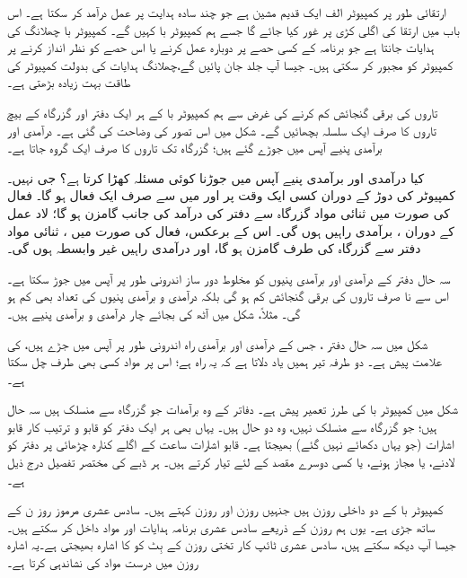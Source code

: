   ارتقائی طور پر کمپیوٹر الف  ایک قدیم  مشین ہے جو  چند سادہ ہدایت پر عمل درآمد کر سکتا ہے۔ اس باب میں  ارتقا کی اگلی کڑی  پر غور کیا جائے گا جسے ہم کمپیوٹر با کہیں گے۔ کمپیوٹر با چھلانگ  کی ہدایات  جانتا ہے جو   برنامہ  کے کسی   حصے پر دوبارہ  عمل کرنے  یا اس حصے کو نظر انداز کرنے پر کمپیوٹر کو  مجبور کر سکتی ہیں۔ جیسا آپ جلد جان پائیں گے،چھلانگ  ہدایات  کی بدولت   کمپیوٹر کی طاقت بہت زیادہ  بڑھتی ہے۔
  
  تاروں کی  برقی گنجائش کم کرنے کی غرض سے ہم کمپیوٹر با   کے ہر ایک دفتر اور  گزرگاہ کے بیچ   تاروں کا صرف ایک سلسلہ بچھائیں گے۔  شکل  میں   اس تصور کی وضاحت کی گئی ہے۔ درآمدی اور برآمدی پنیے آپس میں جوڑے گئے ہیں؛ گزرگاہ  تک  تاروں کا  صرف  ایک گروہ  جاتا ہے۔
  
کیا درآمدی اور برآمدی پنیے آپس میں جوڑنا کوئی  مسئلہ کھڑا کرتا ہے؟ جی نہیں۔ کمپیوٹر کی دوڑ کے دوران کسی ایک وقت پر   اور میں  سے  صرف ایک  فعال ہو گا۔ فعال   کی صورت میں  ثنائی مواد گزرگاہ سے دفتر  کی  درآمد    کی جانب گامزن ہو گا؛ لاد  عمل کے دوران ، برآمدی راہیں ہوں گی۔ اس کے برعکس،  فعال  کی صورت میں ،  ثنائی مواد دفتر سے  گزرگاہ کی طرف گامزن ہو گا، اور درآمدی راہیں غیر وابسطہ ہوں گی۔

سہ  حال دفتر کے درآمدی اور برآمدی پنیوں کو   مخلوط  دور ساز   اندرونی طور  پر  آپس میں جوڑ  سکتا ہے۔ اس سے نا صرف تاروں کی برقی گنجائش کم ہو گی بلکہ  درآمدی و برآمدی   پنیوں کی تعداد بھی کم ہو گی۔ مثلاً، شکل  میں آٹھ کی بجائے چار درآمدی و برآمدی پنیے ہیں۔ 

شکل  میں سہ حال دفتر ، جس کے درآمدی اور برآمدی  راہ  اندرونی طور پر   آپس میں جڑے ہیں، کی علامت  پیش ہے۔ دو طرفہ تیر ہمیں یاد دلاتا ہے کہ یہ راہ ہے؛  اس پر  مواد  کسی بھی  طرف  چل سکتا ہے۔

شکل   میں کمپیوٹر با کی طرز تعمیر پیش ہے۔   دفاتر کے وہ برآمدات جو  گزرگاہ  سے منسلک   ہیں سہ حال ہیں؛ جو  گزرگاہ سے منسلک نہیں، وہ دو حال ہیں۔ یہاں بھی ہر ایک دفتر کو  قابو و ترتیب کار قابو اشارات (جو یہاں دکھائے نہیں گئے)  بھیجتا ہے۔  قابو اشارات ساعت کے   اگلے کنارہ چڑھائی پر دفتر کو لادنے،  یا مجاز  ہونے، یا کسی دوسرے مقصد کے لئے تیار کرتے ہیں۔ ہر ڈبے کی مختصر تفصیل درج ذیل ہے۔

کمپیوٹر با کے دو داخلی روزن ہیں جنہیں روزن  اور روزن  کہتے  ہیں۔  سادس عشری  مرموز   روز ن کے ساتھ جڑی ہے۔ یوں ہم  روزن  کے ذریعے سادس عشری   برنامہ ہدایات اور مواد  داخل کر سکتے ہیں۔ جیسا آپ دیکھ سکتے ہیں، سادس عشری ٹائپ کار تختی روزن   کے بِٹ  کو  کا اشارہ بھیجتی  ہے۔یہ اشارہ روزن  میں درست مواد کی نشاندہی کرتا ہے۔

